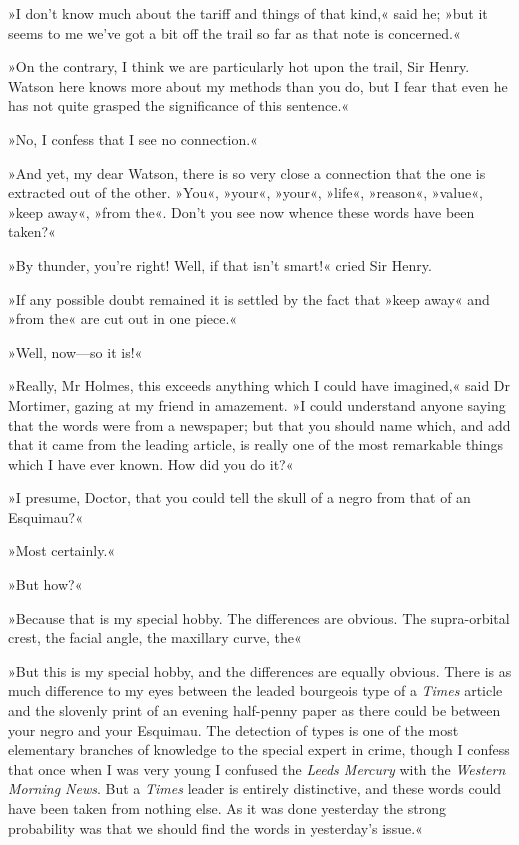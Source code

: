 »I don't know much about the tariff and things of that kind,« said he; »but it seems to me we've got a bit off the trail so far as that note is concerned.«

»On the contrary, I think we are particularly hot upon the trail, Sir Henry. Watson here knows more about my methods than you do, but I fear that even he has not quite grasped the significance of this sentence.«

»No, I confess that I see no connection.«

»And yet, my dear Watson, there is so very close a connection that the one is extracted out of the other. »You«, »your«, »your«, »life«, »reason«, »value«, »keep away«, »from the«. Don't you see now whence these words have been taken?«

»By thunder, you're right! Well, if that isn't smart!« cried Sir Henry.

»If any possible doubt remained it is settled by the fact that »keep away« and »from the« are cut out in one piece.«

»Well, now—so it is!«

»Really, Mr Holmes, this exceeds anything which I could have imagined,« said Dr Mortimer, gazing at my friend in amazement. »I could understand anyone saying that the words were from a newspaper; but that you should name which, and add that it came from the leading article, is really one of the most remarkable things which I have ever known. How did you do it?«


»I presume, Doctor, that you could tell the skull of a negro from that of an Esquimau?«

»Most certainly.«

»But how?«

»Because that is my special hobby. The differences are obvious. The supra-orbital crest, the facial angle, the maxillary curve, the\longdash«

»But this is my special hobby, and the differences are equally obvious. There is as much difference to my eyes between the leaded bourgeois type of a \textit{Times} article and the slovenly print of an evening half-penny paper as there could be between your negro and your Esquimau. The detection of types is one of the most elementary branches of knowledge to the special expert in crime, though I confess that once when I was very young I confused the \textit{Leeds Mercury} with the \textit{Western Morning News}. But a \textit{Times} leader is entirely distinctive, and these words could have been taken from nothing else. As it was done yesterday the strong probability was that we should find the words in yesterday's issue.«

